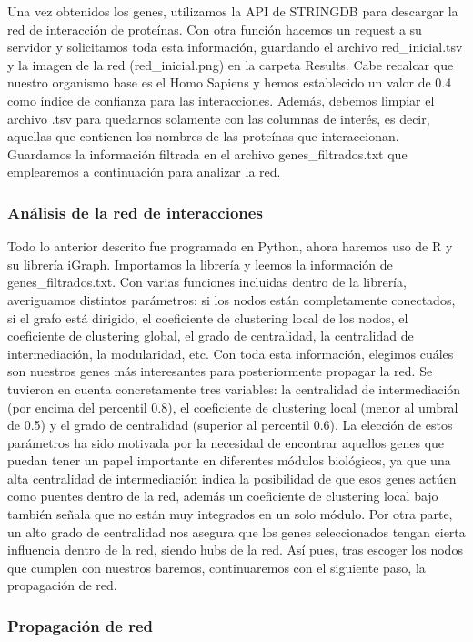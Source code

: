 Una vez obtenidos los genes, utilizamos la API de STRINGDB para descargar la red de interacción de proteínas. Con otra función hacemos un request a su servidor y solicitamos toda esta información, guardando el archivo red_inicial.tsv y la imagen de la red (red_inicial.png) en la carpeta Results. Cabe recalcar que nuestro organismo base es el Homo Sapiens y hemos establecido un valor de 0.4 como índice de confianza para las interacciones. Además, debemos limpiar el archivo .tsv para quedarnos solamente con las columnas de interés, es decir, aquellas que contienen los nombres de las proteínas que interaccionan. Guardamos la información filtrada en el archivo genes_filtrados.txt que emplearemos a continuación para analizar la red.


\subsubsection{Análisis de la red de interacciones}

Todo lo anterior descrito fue programado en Python, ahora haremos uso de R y su librería iGraph. Importamos la librería y leemos la información de genes_filtrados.txt. Con varias funciones incluidas dentro de la librería, averiguamos distintos parámetros: si los nodos están completamente conectados, si el grafo está dirigido, el coeficiente de clustering local de los nodos, el coeficiente de clustering global, el grado de centralidad, la centralidad de intermediación, la modularidad, etc. Con toda esta información, elegimos cuáles son nuestros genes más interesantes para posteriormente propagar la red. Se tuvieron en cuenta concretamente tres variables: la centralidad de intermediación (por encima del percentil 0.8), el coeficiente de clustering local (menor al umbral de 0.5) y el grado de centralidad (superior al percentil 0.6). La elección de estos parámetros ha sido motivada por la necesidad de encontrar aquellos genes que puedan tener un papel importante en diferentes módulos biológicos, ya que una alta centralidad de intermediación indica la posibilidad de que esos genes actúen como puentes dentro de la red, además un coeficiente de clustering local bajo también señala que no están muy integrados en un solo módulo. Por otra parte, un alto grado de centralidad nos asegura que los genes seleccionados tengan cierta influencia dentro de la red, siendo hubs de la red. Así pues, tras escoger los nodos que cumplen con nuestros baremos, continuaremos con el siguiente paso, la propagación de red.  

\subsubsection{Propagación de red}

